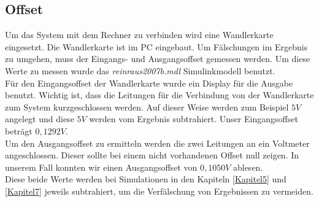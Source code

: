 \subsection{Offset}
Um das System mit dem Rechner zu verbinden wird eine Wandlerkarte eingesetzt. Die Wandlerkarte ist im PC eingebaut. Um Fälschungen im Ergebnis zu umgehen, muss der Eingangs- und Ausgangsoffset gemessen werden. Um diese Werte zu messen wurde das \textit{reinraus2007b.mdl} Simulinkmodell benutzt.\\

Für den Eingangsoffset der Wandlerkarte wurde ein Display für die Ausgabe benutzt. Wichtig ist, dass die Leitungen für die Verbindung von der Wandlerkarte zum System kurzgeschlossen werden. Auf dieser Weise werden zum Beispiel $5V$ angelegt und diese $5V$ werden vom Ergebnis subtrahiert. Unser Eingangsoffset beträgt $0,1292V$.\\

Um den Ausgangsoffset zu ermitteln werden die zwei Leitungen an ein Voltmeter angeschlossen. Dieser sollte bei einem nicht vorhandenen Offset null zeigen. In unserem Fall konnten wir einen Ausgangsoffset von $0,1050V$ ablesen.\\

Diese beide Werte werden bei Simulationen in den Kapiteln \ref{Kapitel5} und \ref{Kapitel7} jeweils  subtrahiert, um die Verfälschung von Ergebnissen zu vermeiden.



